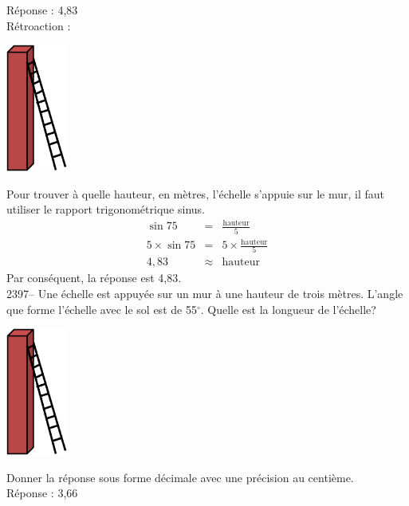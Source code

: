 \documentclass[letterpaper, 12pt]{article}
\begin{document}
R\'eponse : 4,83\\

R\'etroaction :\\
\begin{center}
 \includegraphics[width=2cm,bb=14 14 332 623]{Q2396.eps}
\end{center}
Pour trouver \`a quelle hauteur, en m\`etres, l'\'echelle s'appuie sur le mur, il faut utiliser le rapport trigonom\'etrique sinus.
\begin{eqnarray*}
 \sin{75}&=&\frac{\textrm{hauteur}}{5}\\[2mm]
 5\times \sin{75}&=&5\times \frac{\textrm{hauteur}}{5}\\[2mm]
4,83 &\approx&\textrm{hauteur}
\end{eqnarray*}
Par cons\'equent, la r\'eponse est 4,83.\\

2397-- Une \'echelle est appuy\'ee sur un mur \`a une hauteur de trois m\`etres. L'angle que forme l'\'echelle avec le sol est de 55$^{\circ}$. Quelle est la longueur de l'\'echelle?\\
\begin{center}
 \includegraphics[width=2cm,bb=14 14 332 623]{Q2396.eps}
\end{center}
Donner la r\'eponse sous forme d\'ecimale avec une pr\'ecision au centi\`eme.\\

R\'eponse : 3,66\\
\end{document}
